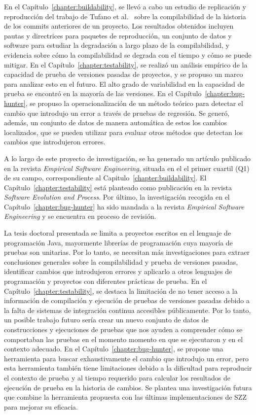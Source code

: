 En el Capítulo~\ref{chapter:buildability}, se llevó a cabo un estudio de replicación y reproducción del trabajo de Tufano et al.~\cite{tufano2017there} sobre la compilabilidad de la historia de los commits anteriores de un proyecto. Los resultados obtenidos incluyen pautas y directrices para paquetes de reproducción, un conjunto de datos y software para estudiar la degradación a largo plazo de la compilabilidad, y evidencia sobre cómo la compilabilidad se degrada con el tiempo y cómo se puede mitigar. 
En el Capítulo~\ref{chapter:testability}, se realizó un análisis empírico de la capacidad de prueba de versiones pasadas de proyectos, y se propuso un marco para analizar esto en el futuro. El alto grado de variabilidad en la capacidad de prueba se encontró en la mayoría de las versiones. 
En el Capítulo~\ref{chapter:bug-hunter}, se propuso la operacionalización de un método teórico para detectar el cambio que introdujo un error a través de pruebas de regresión. 
Se generó, además, un conjunto de datos de manera automática de estos los cambios localizados, que se pueden utilizar para evaluar otros métodos que detectan los cambios que introdujeron errores.

A lo largo de este proyecto de investigación, se ha generado un artículo publicado en la revista \textit{Empirical Software Engineering}, situada en el el primer cuartil (Q1) de su campo, correspondiente al Capitulo~\ref{chapter:buildability}. 
El Capítulo~\ref{chapter:testability} está planteado como publicación en la revista \textit{Software Evolution and Process}. 
Por último, la investigación recogida en el Capítulo~\ref{chapter:bug-hunter} ha sido mandada a la revista \textit{Empirical Software Engineering} y se encuentra en proceso de revisión.

La tesis doctoral presentada se limita a proyectos escritos en el lenguaje de programación Java, mayormente librerías de programación cuya mayoría de pruebas son unitarias. Por lo tanto, se necesitan más investigaciones para extraer conclusiones generales sobre la compilabilidad y prueba de versiones pasadas, identificar cambios que introdujeron errores y aplicarlo a otros lenguajes de programación y proyectos con diferentes prácticas de prueba. En el Capítulo~\ref{chapter:testability}, se destaca la limitación de no tener acceso a la información de compilación y ejecución de pruebas de versiones pasadas debido a la falta de sistemas de integración continua accesibles públicamente. 
Por lo tanto, un posible trabajo futuro sería crear un nuevo conjunto de datos de construcciones y ejecuciones de pruebas que nos ayuden a comprender cómo se comportaban las pruebas en el momento momento en que se ejecutaron y en el contexto adecuado.
En el Capítulo~\ref{chapter:bug-hunter}, se propone una herramienta para buscar exhaustivamente el cambio que introdujo un error, pero esta herramienta también tiene limitaciones debido a la dificultad para reproducir el contexto de prueba y al tiempo requerido para calcular los resultados de ejecución de prueba en la historia de cambios. Se plantea una investigación futura que combine la herramienta propuesta con las últimas implementaciones de SZZ para mejorar su eficacia.